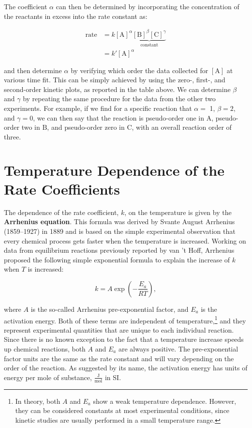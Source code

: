 \documentclass[
  9pt,
]{extbook}
\theoremstyle{definition}
\theoremstyle{definition}
\theoremstyle{definition}
\theoremstyle{definition}
\theoremstyle{remark}
\begin{document}
The coefficient \(\alpha\) can then be determined by incorporating the concentration of the reactants in excess into the rate constant as:

\begin{equation}
\begin{aligned}
\text{rate}&=k[\mathrm{A}]^{\alpha}\underbrace{[\mathrm{B}]^{\beta}[\mathrm{C}]^{\gamma}}_{\text{constant}} \\
&= k'[\mathrm{A}]^{\alpha}
\end{aligned}
\end{equation}

and then determine \(\alpha\) by verifying which order the data collected for \([\mathrm{A}]\) at various time fit. This can be simply achieved by using the zero-, first-, and second-order kinetic plots, as reported in the table above. We can determine \(\beta\) and \(\gamma\) by repeating the same procedure for the data from the other two experiments. For example, if we find for a specific reaction that \(\alpha=\) 1, \(\beta=2\), and \(\gamma=0\), we can then say that the reaction is pseudo-order one in \(\mathrm{A}\), pseudo-order two in \(\mathrm{B}\), and pseudo-order zero in \(\mathrm{C}\), with an overall reaction order of three.

\section{Temperature Dependence of the Rate Coefficients}\label{temperature-dependence-of-the-rate-coefficients}

The dependence of the rate coefficient, \(k\), on the temperature is given by the \textbf{Arrhenius equation}. This formula was derived by Svante August Arrhenius (1859--1927) in 1889 and is based on the simple experimental observation that every chemical process gets faster when the temperature is increased. Working on data from equilibrium reactions previously reported by van 't Hoff, Arrhenius proposed the following simple exponential formula to explain the increase of \(k\) when \(T\) is increased:

\begin{equation}
k=A\exp\left( -\frac{E_a}{RT}\right),
\label{eq:Arr1}
\end{equation}

where \(A\) is the so-called Arrhenius pre-exponential factor, and \(E_a\) is the activation energy. Both of these terms are independent of temperature,\footnote{In theory, both \(A\) and \(E_a\) show a weak temperature dependence. However, they can be considered constants at most experimental conditions, since kinetic studies are usually performed in a small temperature range.} and they represent experimental quantities that are unique to each individual reaction. Since there is no known exception to the fact that a temperature increase speeds up chemical reactions, both \(A\) and \(E_a\) are always positive. The pre-exponential factor units are the same as the rate constant and will vary depending on the order of the reaction. As suggested by its name, the activation energy has units of energy per mole of substance, \(\frac{\mathrm{J}}{\mathrm{mol}}\) in SI.
\end{document}
